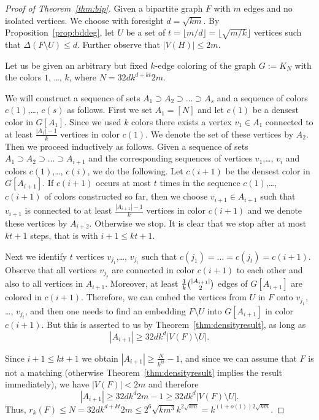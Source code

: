 \documentclass[reqno]{amsart}
\theoremstyle{remark}
\begin{document}
\begin{proof}[Proof of Theorem~\ref{thm:bip}]
Given a bipartite graph $F$ with $m$ edges and no isolated vertices. We choose with foresight $d=\sqrt{km}$. 
By Proposition~\ref{prop:bddeg}, let $U$ be a set of $t=\lfloor m/d\rfloor=\lfloor \sqrt{m/k}\rfloor$ vertices 
such that $\Delta(F\setminus U)\le d$. Further observe that $|V(H)|\le 2m$. 

Let us be given an arbitrary but fixed $k$-edge coloring of the graph $G:=K_N$ with the colors $1$, \ldots, $k$, where $N = 32dk^{d+kt}2m$. 

We will construct a sequence of sets $A_1\supset A_2\supset \ldots\supset A_s$ and a sequence of colors $c(1)$,\ldots, $c(s)$ as follows. 
First we set $A_1=[N]$ and let $c(1)$ be a densest color in $G[A_1]$. 
Since we used $k$ colors there exists a vertex $v_1\in A_1$ connected to at least   
 $\tfrac{|A_1|-1}{k}$ vertices in color $c(1)$. We denote the set of these vertices by $A_2$. Then we proceed inductively as follows. 
Given a sequence of sets $A_1\supset A_2\supset \ldots\supset A_{i+1}$ and the corresponding sequences of vertices $v_1$,\ldots, $v_i$ and colors 
$c(1)$,\ldots, $c(i)$, we do the following. Let $c(i+1)$ be the densest color in $G[A_{i+1}]$. If $c(i+1)$ occurs at most $t$ times in the sequence $c(1)$,\ldots, $c(i+1)$ of colors constructed so far, 
then we choose $v_{i+1}\in A_{i+1}$ such that $v_{i+1}$ is connected to at least $\tfrac{|A_{i+1}|-1}{k}$ vertices in color $c(i+1)$ and we denote these vertices by $A_{i+2}$.
Otherwise we stop. It is clear that we stop after at most $kt+1$ steps, that is with $i+1\le kt+1$.

Next we identify $t$ vertices  $v_{j_1}$,\ldots, $v_{j_t}$ such that $c(j_1)=\ldots=c(j_t)=c(i+1)$. Observe that all vertices $v_{j_s}$ are connected in color $c(i+1)$ to each other 
and also to all vertices in $A_{i+1}$. Moreover, at least $\tfrac{1}{k}\tbinom{|A_{i+1}|}{2}$ edges of 
$G[A_{i+1}]$ are colored in $c(i+1)$. Therefore, we can embed the vertices from $U$ in $F$ onto 
$v_{j_1}$, \ldots, $v_{j_t}$, and then one needs to find an embedding 
$F\setminus U$ into $G[A_{i+1}]$ in color $c(i+1)$. 
But this is asserted to us by Theorem~\ref{thm:densityresult}, as long as 
\[
 |A_{i+1}|\ge 32 d k^d |V(F)\setminus U|.
\]

Since $i+1\le kt+1$ we obtain $|A_{i+1}|\ge \tfrac{N}{k^{kt}}-1$, and since we can assume 
that $F$ is not a matching (otherwise Theorem~\ref{thm:densityresult} implies the result immediately), 
we have $|V(F)|< 2m$ and therefore
\[
   |A_{i+1}|\ge 32 d k^d 2m-1\ge 32 d k^d |V(F)\setminus U|.
\]
Thus, $r_k(F)\le N= 32dk^{d+kt}2m\le 2^6 \sqrt{km^3} k^{2\sqrt{km}}=k^{(1+o(1))2\sqrt{km}}$. %
 \end{proof}
\end{document}
